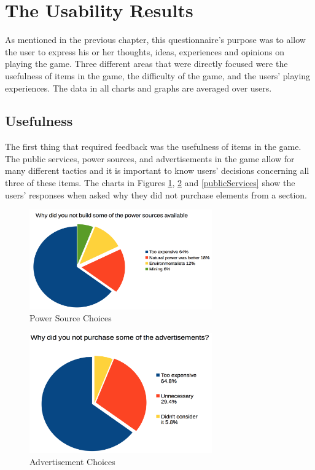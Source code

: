 \documentclass[msc,oneside]{ubcthesis}%
\begin{document}
\section{The Usability Results}
As mentioned in the previous chapter, this questionnaire's purpose was to allow the user to express his or her thoughts, ideas, experiences and opinions on playing the game. Three different areas that were directly focused were the usefulness of items in the game, the difficulty of the game, and the users' playing experiences. The data in all charts and graphs are averaged over users.

\subsection{Usefulness}
\indent The first thing that required feedback was the usefulness of items in the game. The public services, power sources, and advertisements in the game allow for many different tactics and it is important to know users' decisions concerning all three of these items. The charts in Figures \ref{powerSources}, \ref{ads} and \ref{publicServices} show the users' responses when asked why they did not purchase elements from a section.
 \newpage
\begin{figure}[hbt]
  \begin{center}
    \includegraphics[width=0.7\textwidth]{survey_pics/numeric/power_source}
    \caption[Power Source Choices]{Power Source Choices}\label{powerSources}
  \end{center}
\end{figure}

\begin{figure}[hbt]
  \begin{center}
    \includegraphics[width=0.7\textwidth]{survey_pics/numeric/adds}
    \caption[Advertisement Choices]{Advertisement Choices}\label{ads}
  \end{center}
\end{figure}
\end{document}
